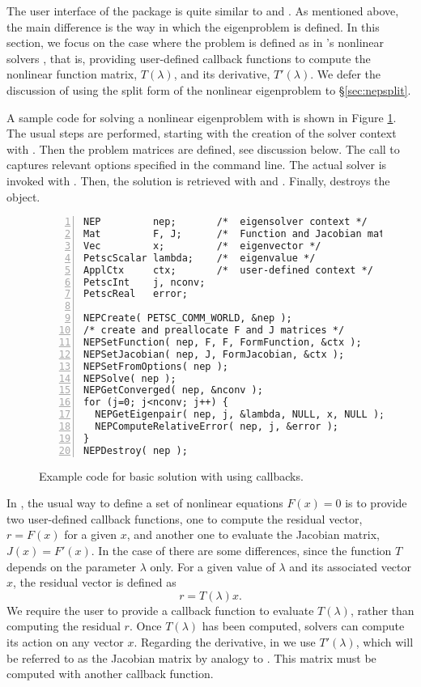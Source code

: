 The user interface of the  package is quite similar to  and . As mentioned above, the main difference is the way in which the eigenproblem is defined. In this section, we focus on the case where the problem is defined as in \petsc's nonlinear solvers , that is, providing user-defined callback functions to compute the nonlinear function matrix, $T(\lambda)$, and its derivative, $T'(\lambda)$. We defer the discussion of using the split form of the nonlinear eigenproblem to \S\ref{sec:nepsplit}.

A sample code for solving a nonlinear eigenproblem with  is shown in Figure \ref{fig:ex-nep}. The usual steps are performed, starting with the creation of the solver context with . Then the problem matrices are defined, see discussion below. The call to  captures relevant options specified in the command line. The actual solver is invoked with . Then, the solution is retrieved with  and . Finally,  destroys the object.

\begin{figure}
\begin{Verbatim}[fontsize=\small,numbers=left,numbersep=6pt,xleftmargin=15mm]
NEP         nep;       /*  eigensolver context */
Mat         F, J;      /*  Function and Jacobian matrices  */
Vec         x;         /*  eigenvector */
PetscScalar lambda;    /*  eigenvalue */
ApplCtx     ctx;       /*  user-defined context */
PetscInt    j, nconv;
PetscReal   error;

NEPCreate( PETSC_COMM_WORLD, &nep );
/* create and preallocate F and J matrices */
NEPSetFunction( nep, F, F, FormFunction, &ctx );
NEPSetJacobian( nep, J, FormJacobian, &ctx );
NEPSetFromOptions( nep );
NEPSolve( nep );
NEPGetConverged( nep, &nconv );
for (j=0; j<nconv; j++) {
  NEPGetEigenpair( nep, j, &lambda, NULL, x, NULL );
  NEPComputeRelativeError( nep, j, &error );
}
NEPDestroy( nep );
\end{Verbatim}
\caption{\label{fig:ex-nep}Example code for basic solution with  using callbacks.}
\end{figure}

In , the usual way to define a set of nonlinear equations $F(x)=0$ is to provide two user-defined callback functions, one to compute the residual vector, $r=F(x)$ for a given $x$, and another one to evaluate the Jacobian matrix, $J(x)=F'(x)$.
In the case of  there are some differences, since the function $T$ depends on the parameter $\lambda$ only. For a given value of $\lambda$ and its associated vector $x$, the residual vector is defined as
\begin{equation}
r=T(\lambda)x.\label{eq:nlres}
\end{equation}
We require the user to provide a callback function to evaluate $T(\lambda)$, rather than computing the residual $r$. Once $T(\lambda)$ has been computed,  solvers can compute its action on any vector $x$. Regarding the derivative, in  we use $T'(\lambda)$, which will be referred to as the Jacobian matrix by analogy to . This matrix must be computed with another callback function.

